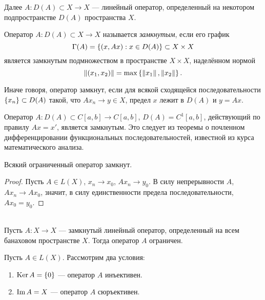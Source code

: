 Далее $A \colon D(A) \subset X \to X$ --- линейный оператор, определенный на некотором
подпространстве $D(A)$ пространства $X$.

\begin{definition}
    Оператор $A \colon D(A) \subset X \to X$ называется \emph{замкнутым}, если его график
    \[ \Gamma(A) = \left\{(x, Ax) : x \in D(A)\right\} \subset X \times X \]
    является замкнутым подмножеством в пространстве $X \times X$, наделённом нормой
    \[ \left\|(x_1, x_2)\right\| = \max\left\{\left\|x_1\right\|, \left\|x_2\right\|\right\}. \]
\end{definition}

Иначе говоря, оператор замкнут, 
если для всякой сходящейся последовательности $\left\{x_n\right\} \subset D(A)$ такой, что
$Ax_n \to y \in X$, предел $x$ лежит в $D(A)$ и $y = Ax$.

\begin{example}
    Оператор $A \colon D(A) \subset C[a,b] \to C[a,b]$, $D(A) = C^1[a,b]$, действующий по правилу
    $Ax = x'$, является замкнутым. Это следует из теоремы о почленном дифференцировании
    функциональных последовательностей, известной из курса математического анализа.
\end{example}

\begin{theorem}
    Всякий ограниченный оператор замкнут.
\end{theorem}

\begin{proof}
    Пусть $A \in L(X)$, $x_n \to x_0$, $Ax_n \to y_0$. В силу непрерывности $A$, $Ax_n \to Ax_0$, значит, в силу единственности предела последовательности, $Ax_0 = y_0$.
\end{proof}

\begin{theorem}\hfill\\
    \indent Пусть $A \colon X \to X$ --- замкнутый линейный оператор, определенный на всем
    банаховом пространстве $X$. Тогда оператор $A$ ограничен.
\end{theorem}

\vspace{0.5cm}

Пусть $A \in L(X)$. Рассмотрим два условия:
\begin{enumerate}
    \item $\operatorname{Ker} A = \left\{0\right\}$ --- оператор $A$ инъективен.
    \item $\operatorname{Im} A = X$ --- оператор $A$ сюръективен.
\end{enumerate}

